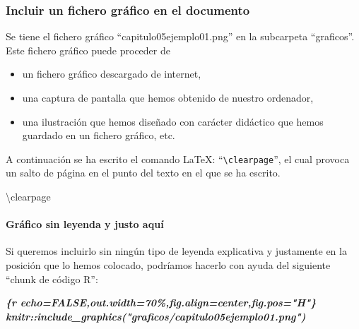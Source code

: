\documentclass[12pt,a4paper,oneside,]{article}
\newenvironment{Shaded}{\begin{snugshade}}{\end{snugshade}}
\newcommand{\InformationTok}[1]{\textcolor[rgb]{0.56,0.35,0.01}{\textbf{\textit{#1}}}}
\newcommand{\NormalTok}[1]{#1}
\providecommand{\tightlist}{%
  \setlength{\itemsep}{0pt}\setlength{\parskip}{0pt}}
\let\oldparagraph\paragraph
\renewcommand{\paragraph}[1]{\oldparagraph{#1}\mbox{}}
\numberwithin{dummy}{section}
\theoremstyle{ocrenumbox}
\theoremstyle{blacknumex}
\theoremstyle{blacknumbox}
\theoremstyle{ocrenum}
\theoremstyle{ocrenum}
\begin{document}
\hypertarget{incluir-un-fichero-gruxe1fico-en-el-documento}{%
\subsubsection{Incluir un fichero gráfico en el
documento}\label{incluir-un-fichero-gruxe1fico-en-el-documento}}

Se tiene el fichero gráfico ``capitulo05ejemplo01.png'' en la subcarpeta
``graficos''. Este fichero gráfico puede proceder de

\begin{itemize}
\tightlist
\item
  un fichero gráfico descargado de internet,
\item
  una captura de pantalla que hemos obtenido de nuestro ordenador,
\item
  una ilustración que hemos diseñado con carácter didáctico que hemos
  guardado en un fichero gráfico, etc.
\end{itemize}

A continuación se ha escrito el comando LaTeX:
``\texttt{\textbackslash{}clearpage}'', el cual provoca un salto de
página en el punto del texto en el que se ha escrito.

\begin{Shaded}
\begin{Highlighting}[]
\NormalTok{\textbackslash{}clearpage}
\end{Highlighting}
\end{Shaded}

\clearpage

\hypertarget{gruxe1fico-sin-leyenda-y-justo-aquuxed}{%
\paragraph{Gráfico sin leyenda y justo
aquí}\label{gruxe1fico-sin-leyenda-y-justo-aquuxed}}

Si queremos incluirlo sin ningún tipo de leyenda explicativa y
justamente en la posición que lo hemos colocado, podríamos hacerlo con
ayuda del siguiente ``chunk de código R'':

\begin{Shaded}
\begin{Highlighting}[]
\InformationTok{\textasciigrave{}\textasciigrave{}\textasciigrave{}\{r echo=FALSE,out.width=\textquotesingle{}70\%\textquotesingle{},fig.align=\textquotesingle{}center\textquotesingle{},fig.pos="H"\}}
\InformationTok{knitr::include\_graphics("graficos/capitulo05ejemplo01.png")}
\InformationTok{\textasciigrave{}\textasciigrave{}\textasciigrave{}}
\end{Highlighting}
\end{Shaded}
\end{document}
